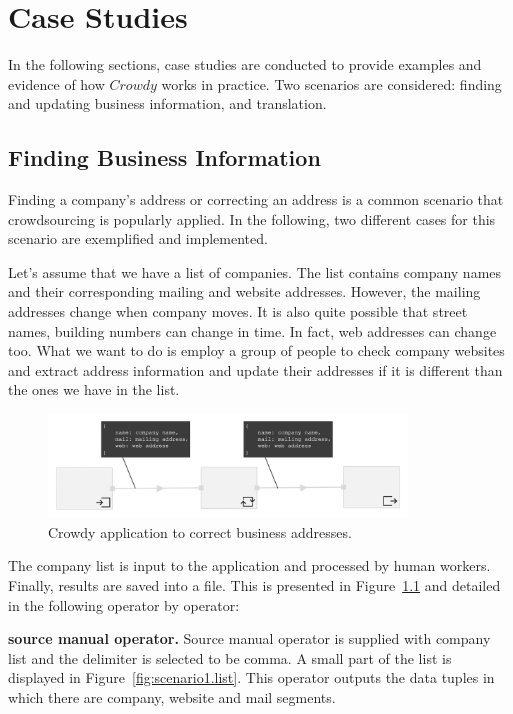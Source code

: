 \chapter{Case Studies}
\label{chap:examples}

In the following sections, case studies are conducted to provide examples 
and evidence of how $Crowdy$ works in practice. Two scenarios are considered: 
finding and updating business information, and translation.

\section{Finding Business Information}
Finding a company's address or correcting an address is a common scenario that crowdsourcing is popularly applied. In the following, two different cases for this scenario are exemplified and implemented.

Let's assume that we have a list of companies. The list contains company names and their corresponding mailing and website addresses. However, the mailing addresses change when company moves. It is also quite possible that street names, building numbers can change in time. In fact, web addresses can change too. What we want to do is employ a group of people to check company websites and extract address information and update their addresses if it is different than the ones we have in the list.

\begin{figure}[ht]
	\centering
	\includegraphics[width=0.85\textwidth]{figures/scenarios/scenario1_1a.png}
	\caption{Crowdy application to correct business addresses.}
	\label{fig:scenario1}
\end{figure}

The company list is input to the application and processed by human workers. Finally, results are saved into a file. This is presented in Figure~\ref{fig:scenario1} and detailed in the following operator by operator:

\textbf{source manual operator.}
Source manual operator is supplied with company list and the delimiter is selected to be comma. A small part of the list is displayed in Figure~\ref{fig:scenario1.list}. This operator outputs the data tuples in which there are company, website and mail segments.

